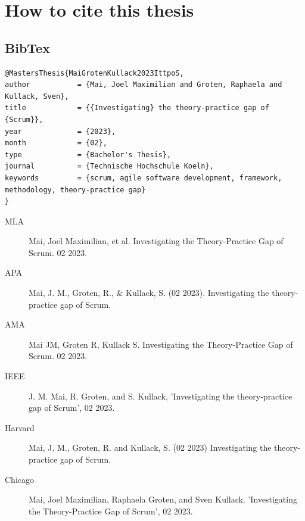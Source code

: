 \section{How to cite this thesis}
\subsection*{BibTex}
\begin{lstlisting}[label={lst:HowToCite}]
@MastersThesis{MaiGrotenKullack2023IttpoS,
author           = {Mai, Joel Maximilian and Groten, Raphaela and Kullack, Sven},
title            = {{Investigating} the theory-practice gap of {Scrum}},
year             = {2023},
month            = {02},
type             = {Bachelor's Thesis},
journal          = {Technische Hochschule Koeln},
keywords         = {scrum, agile software development, framework, methodology, theory-practice gap}
}
\end{lstlisting}

\begin{description}
    \item[MLA] Mai, Joel Maximilian, et al. Investigating the Theory-Practice Gap of Scrum. 02 2023.
    \item[APA] Mai, J. M., Groten, R., \& Kullack, S. (02 2023). Investigating the theory-practice gap of Scrum.
    \item[AMA] Mai JM, Groten R, Kullack S. Investigating the Theory-Practice Gap of Scrum. 02 2023.
    \item[IEEE] J. M. Mai, R. Groten, and S. Kullack, 'Investigating the theory-practice gap of Scrum', 02 2023.
    \item[Harvard] Mai, J. M., Groten, R. and Kullack, S. (02 2023) Investigating the theory-practice gap of Scrum.
    \item[Chicago] Mai, Joel Maximilian, Raphaela Groten, and Sven Kullack. 'Investigating the Theory-Practice Gap of Scrum', 02 2023.
\end{description}

\renewcommand{\refname}{List of References}


\newpage
\listoffigures
	
